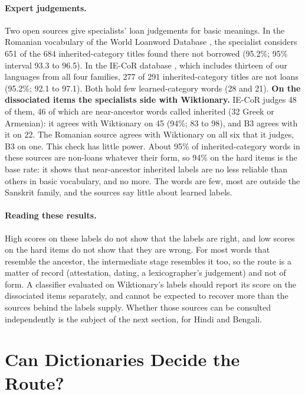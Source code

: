 \documentclass[11pt]{article}
\begin{document}
\paragraph{Expert judgements.} Two open sources give specialists' loan judgements for basic meanings. In the Romanian vocabulary of the World Loanword Database \citep{schulte2009romanian}, the specialist considers 651 of the 684 inherited-category titles found there not borrowed (95.2\%; 95\% interval 93.3 to 96.5). In the IE-CoR database \citep{heggarty2024iecor}, which includes thirteen of our languages from all four families, 277 of 291 inherited-category titles are not loans (95.2\%; 92.1 to 97.1). Both hold few learned-category words (28 and 21). \textbf{On the dissociated items the specialists side with Wiktionary.} IE-CoR judges 48 of them, 46 of which are near-ancestor words called inherited (32 Greek or Armenian): it agrees with Wiktionary on 45 (94\%; 83 to 98), and B3 agrees with it on 22. The Romanian source agrees with Wiktionary on all six that it judges, B3 on one. This check has little power. About 95\% of inherited-category words in these sources are non-loans whatever their form, so 94\% on the hard items is the base rate: it shows that near-ancestor inherited labels are no less reliable than others in basic vocabulary, and no more. The words are few, most are outside the Sanskrit family, and the sources say little about learned labels.

\paragraph{Reading these results.} High scores on these labels do not show that the labels are right, and low scores on the hard items do not show that they are wrong. For most words that resemble the ancestor, the intermediate stage resembles it too, so the route is a matter of record (attestation, dating, a lexicographer's judgement) and not of form. A classifier evaluated on Wiktionary's labels should report its score on the dissociated items separately, and cannot be expected to recover more than the sources behind the labels supply. Whether those sources can be consulted independently is the subject of the next section, for Hindi and Bengali.

\section{Can Dictionaries Decide the Route?}
\label{sec:why}
\end{document}
